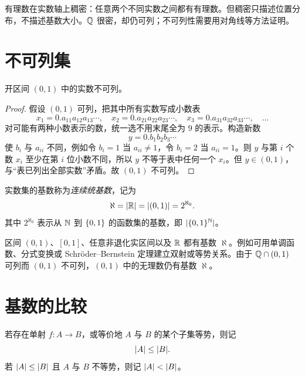 \begin{pitfall}\label{dense-countable}
  有理数在实数轴上稠密：任意两个不同实数之间都有有理数。但稠密只描述位置分布，不描述基数大小。$\mathbb{Q}$ 很密，却仍可列；不可列性需要用对角线等方法证明。
\end{pitfall}

\section{不可列集}

\begin{theorem}\label{cantor-diagonal-real}
  开区间 $(0,1)$ 中的实数不可列。
\end{theorem}

\begin{proof}
  假设 $(0,1)$ 可列，把其中所有实数写成小数表
  \[
  x_1=0.a_{11}a_{12}a_{13}\cdots,\quad
  x_2=0.a_{21}a_{22}a_{23}\cdots,\quad
  x_3=0.a_{31}a_{32}a_{33}\cdots,\quad\ldots
  \]
  对可能有两种小数表示的数，统一选不用末尾全为 $9$ 的表示。构造新数
  \[
  y=0.b_1b_2b_3\cdots
  \]
  使 $b_i$ 与 $a_{ii}$ 不同，例如令 $b_i=1$ 当 $a_{ii}\ne1$，令 $b_i=2$ 当 $a_{ii}=1$。则 $y$ 与第 $i$ 个数 $x_i$ 至少在第 $i$ 位小数不同，所以 $y$ 不等于表中任何一个 $x_i$。但 $y\in(0,1)$，与“表已列出全部实数”矛盾。故 $(0,1)$ 不可列。
\end{proof}

\begin{definition}[连续统基数]\label{continuum-cardinality}
  实数集的基数称为\emph{连续统基数}，记为
  \[
  \aleph=\lvert\mathbb{R}\rvert=\lvert(0,1)\rvert=2^{\aleph_0}.
  \]
  其中 $2^{\aleph_0}$ 表示从 $\mathbb{N}$ 到 $\{0,1\}$ 的函数集的基数，即 $\lvert\{0,1\}^{\mathbb{N}}\rvert$。
\end{definition}

区间 $(0,1)$、$[0,1]$、任意非退化实区间以及 $\mathbb{R}$ 都有基数 $\aleph$。例如可用单调函数、分式变换或 Schröder--Bernstein 定理建立双射或等势关系。由于 $\mathbb{Q}\cap(0,1)$ 可列而 $(0,1)$ 不可列，$(0,1)$ 中的无理数仍有基数 $\aleph$。

\section{基数的比较}

\begin{definition}[基数不等式]\label{cardinal-order}
  若存在单射 $f:A\to B$，或等价地 $A$ 与 $B$ 的某个子集等势，则记
  \[
  \lvert A\rvert\le \lvert B\rvert.
  \]
  若 $\lvert A\rvert\le\lvert B\rvert$ 且 $A$ 与 $B$ 不等势，则记 $\lvert A\rvert<\lvert B\rvert$。
\end{definition}

